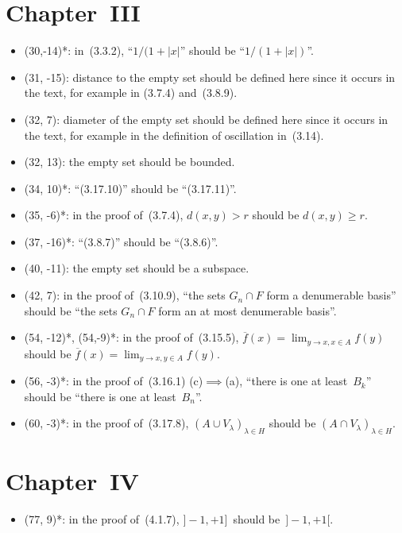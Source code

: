 \documentclass[letterpaper,12pt]{article}
\newcommand{\union}{\cup}
\newcommand{\sect}{\cap}
\newcommand{\abs}[1]{|{#1}|}
\begin{document}
\section*{Chapter~III}
\begin{itemize}
\item (30,-14)*: in~(3.3.2), ``\(1/(1+\abs{x}\)'' should be ``\(1/(1+\abs{x})\)''.
\item (31, -15): distance to the empty set should be defined here since it occurs in the text, for example in (3.7.4) and~(3.8.9).
\item (32, 7): diameter of the empty set should be defined here since it occurs in the text, for example in the definition of oscillation in~(3.14).
\item (32, 13): the empty set should be bounded.
\item (34, 10)*: ``(3.17.10)'' should be ``(3.17.11)''.
\item (35, -6)*: in the proof of~(3.7.4), \(d(x,y)>r\) should be \(d(x,y)\ge r\).
\item (37, -16)*: ``(3.8.7)'' should be ``(3.8.6)''.
\item (40, -11): the empty set should be a subspace.
\item (42, 7): in the proof of~(3.10.9), ``the sets \(G_n\sect F\) form a denumerable basis'' should be ``the sets \(G_n\sect F\) form an at most denumerable basis''.
\item (54, -12)*, (54,-9)*: in the proof of~(3.15.5), \(\overline{f}(x)=\lim_{y\to x,x\in A}f(y)\) should be \(\overline{f}(x)=\lim_{y\to x,y\in A}f(y)\).
\item (56, -3)*: in the proof of~(3.16.1) (c)\(\implies\)(a), ``there is one at least~\(B_k\)'' should be ``there is one at least~\(B_n\)''.
\item (60, -3)*: in the proof of~(3.17.8), \((A\union V_{\lambda})_{\lambda\in H}\) should be \((A\sect V_{\lambda})_{\lambda\in H}\).
\end{itemize}

\section*{Chapter~IV}
\begin{itemize}
\item (77, 9)*: in the proof of~(4.1.7), \(]-1,+1]\)~should be~\(]-1,+1[\).
\end{itemize}
\end{document}

